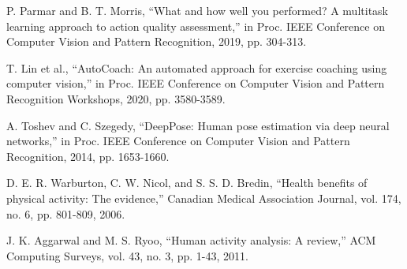 \documentclass[11pt]{article}
\begin{document}
\begin{thebibliography}{16}
 P. Parmar and B. T. Morris, ``What and how well you performed? A multitask learning approach to action quality assessment,'' in Proc. IEEE Conference on Computer Vision and Pattern Recognition, 2019, pp. 304-313.

 T. Lin et al., ``AutoCoach: An automated approach for exercise coaching using computer vision,'' in Proc. IEEE Conference on Computer Vision and Pattern Recognition Workshops, 2020, pp. 3580-3589.

 A. Toshev and C. Szegedy, ``DeepPose: Human pose estimation via deep neural networks,'' in Proc. IEEE Conference on Computer Vision and Pattern Recognition, 2014, pp. 1653-1660.

 D. E. R. Warburton, C. W. Nicol, and S. S. D. Bredin, ``Health benefits of physical activity: The evidence,'' Canadian Medical Association Journal, vol. 174, no. 6, pp. 801-809, 2006.

 J. K. Aggarwal and M. S. Ryoo, ``Human activity analysis: A review,'' ACM Computing Surveys, vol. 43, no. 3, pp. 1-43, 2011.
\end{thebibliography}
\end{document}

